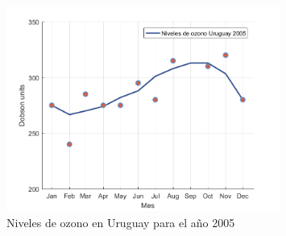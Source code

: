 \documentclass[a4paper]{article}
\begin{document}
\begin{figure}[ht]
\centering
\includegraphics[width=0.8\textwidth]{assets/UY2005.png}
\caption{\label{fig:area_antartida}Niveles de ozono en Uruguay para el año 2005}
\end{figure}
          
\end{document}
